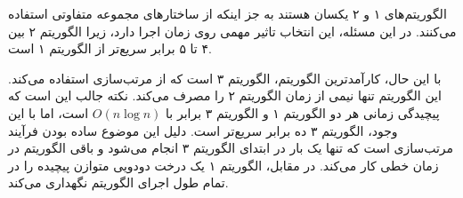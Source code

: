 الگوریتم‌های ۱ و ۲ یکسان هستند به جز اینکه
از ساختارهای مجموعه متفاوتی استفاده می‌کنند.
در این مسئله، این انتخاب تاثیر مهمی روی
زمان اجرا دارد، زیرا الگوریتم ۲
بین ۴ تا ۵ برابر سریع‌تر از الگوریتم ۱ است.

با این حال، کارآمدترین الگوریتم، الگوریتم ۳ است
که از مرتب‌سازی استفاده می‌کند.
این الگوریتم تنها نیمی از زمان الگوریتم ۲ را مصرف می‌کند.
نکته جالب این است که پیچیدگی زمانی هر دو
الگوریتم ۱ و الگوریتم ۳ برابر با $O(n \log n)$ است،
اما با این وجود، الگوریتم ۳ ده برابر سریع‌تر است.
دلیل این موضوع ساده بودن فرآیند مرتب‌سازی است
که تنها یک بار در ابتدای الگوریتم ۳ انجام می‌شود
و باقی الگوریتم در زمان خطی کار می‌کند.
در مقابل،
الگوریتم ۱ یک درخت دودویی متوازن پیچیده را
در تمام طول اجرای الگوریتم نگهداری می‌کند.